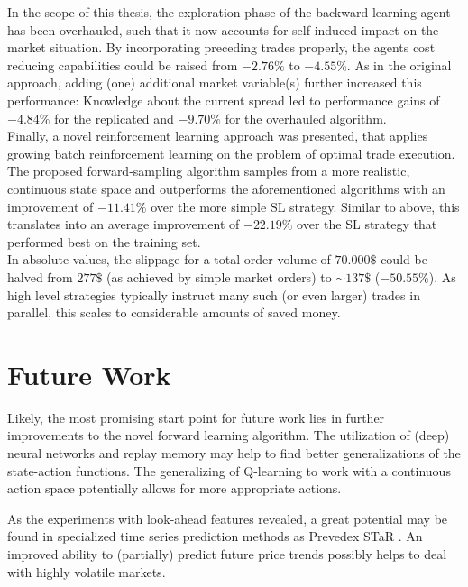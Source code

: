 In the scope of this thesis, the exploration phase of the backward learning agent has been overhauled, such that it now accounts for self-induced impact on the market situation. By incorporating preceding trades properly, the agents cost reducing capabilities could be raised from $-2.76\%$ to $-4.55\%$. As in the original approach, adding (one) additional market variable(s) further increased this performance: Knowledge about the current spread led to performance gains of $-4.84\%$ for the replicated and $-9.70\%$ for the overhauled algorithm.\\

Finally, a novel reinforcement learning approach was presented, that applies growing batch reinforcement learning on the problem of optimal trade execution. The proposed forward-sampling algorithm samples from a more realistic, continuous state space and outperforms the aforementioned algorithms with an improvement of $-11.41\%$ over the more simple \ac{SL} strategy. Similar to above, this translates into an average improvement of $-22.19\%$ over the \ac{SL} strategy that performed best on the training set.\\

In absolute values, the slippage for a total order volume of $70.000\$$ could be halved from $277\$$ (as achieved by simple market orders) to $\sim137\$$ ($-50.55\%$). As high level strategies typically instruct many such (or even larger) trades in parallel, this scales to considerable amounts of saved money.





\section{Future Work}
Likely, the most promising start point for future work lies in further improvements to the novel forward learning algorithm. The utilization of (deep) neural networks and replay memory may help to find better generalizations of the state-action functions. The generalizing of Q-learning to work with a continuous action space potentially allows for more appropriate actions. 

As the experiments with look-ahead features revealed, a great potential may be found in specialized time series prediction methods as \eg Prevedex STaR \Cite{STAR}. An improved ability to (partially) predict future price trends possibly helps to deal with highly volatile markets.


